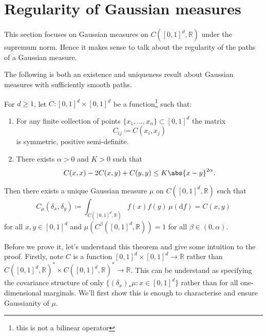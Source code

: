 \documentclass[fontsize=12pt, DIV=10]{scrreprt}
\theoremstyle{remark}
\newcommand{\defeq}{\coloneqq}
\newcommand{\R}{\mathbb R}
\newcommand{\dif}[1]{\text{d} #1}
\begin{document}
\section{Regularity of Gaussian measures}

This section focuses on Gaussian measures on $C([0,1]^d, \R)$ under the supremum norm. Hence it makes sense to talk about the regularity of the paths of a Gaussian measure.

The following is both an existence and uniqueness result about Gaussian measures with sufficiently smooth paths.
\begin{theorem}
	\label{thm:kcc}
	For $d \geq 1$, let $C: [0, 1]^d \times [0, 1]^d$ be a function\footnote{this is not a bilinear operator} such that:
	\begin{enumerate}
		\item For any finite collection of points $\{x_1, \ldots, x_n\} \subset [0, 1]^d$ the matrix
			\begin{equation}
				C_{ij} \defeq C(x_i, x_j)
			\end{equation}
			is symmetric, positive semi-definite.
		\item There exists $\alpha > 0$ and $K > 0$ such that
			\begin{equation}
				C(x, x) - 2C(x, y) + C(y, y) \leq K \abs{x - y}^{2 \alpha}.
			\end{equation}
	\end{enumerate}
	Then there exists a unique Gaussian measure $\mu$ on $C([0, 1]^d, \R)$ such that
	\begin{equation}
		C_{\mu}(\delta_x, \delta_y) \defeq \int_{C([0, 1]^d, \R)} f(x) f(y) \, \mu(\dif f) = C(x, y)
	\end{equation}
	for all $x, y \in [0, 1]^d$ and $\mu(C^{\beta}([0, 1]^d, \R)) = 1$ for all $\beta \in (0, \alpha)$.
\end{theorem}

Before we prove it, let's understand this theorem and give some intuition to the proof. Firstly, note $C$ is a function $[0,1]^d \times [0, 1]^d \to \R$ rather than $C([0,1]^d, \R)^* \times C([0, 1]^d, \R)^* \to \R$. This can be understand as specifying the covariance structure of only $\{(\delta_x)_* \mu : x \in [0, 1]^d\}$ rather than for all one-dimensional marginals. We'll first show this is enough to characterise and ensure Gaussianity of $\mu$.
\end{document}
